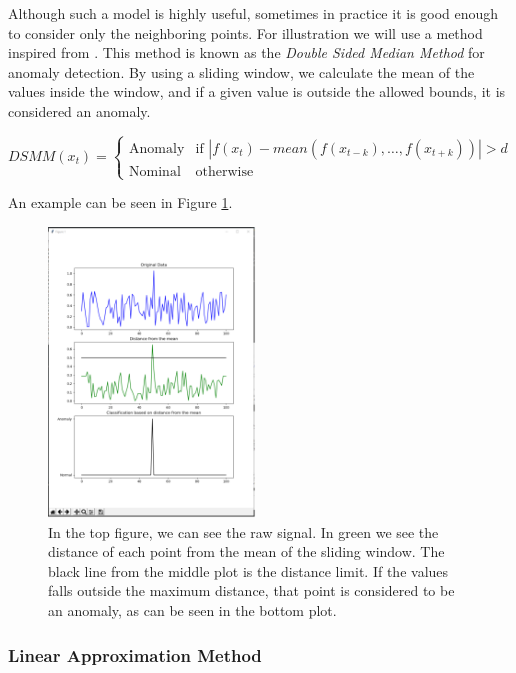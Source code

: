 \documentclass[a4paper, 10pt]{article}
\begin{document}
Although such a model is highly useful, sometimes in practice it is good enough to consider only the neighboring points. For illustration we will use a method inspired from \cite{MMAD2006}. This method is known as the \emph{Double Sided Median Method} for anomaly detection. By using a sliding window, we calculate the mean of the values inside the window, and if a given value is outside the allowed bounds, it is considered an anomaly. 

$$
	DSMM(x_t) = 
		\begin{cases}
            \text{Anomaly} & \text{if } |f(x_t) - mean(f(x_{t-k}), \dots, f(x_{t+k}))| > d \\
            \text{Nominal} & \text{otherwise}
        \end{cases}
$$

An example can be seen in Figure \ref{fig:DSMM}. \\

\begin{figure}
\centering
\includegraphics[width=0.49\textwidth]{DSMM}
\caption{In the top figure, we can see the raw signal. In green we see the distance of each point from the mean of the sliding window. The black line from the middle plot is the distance limit. If the values falls outside the maximum distance, that point is considered to be an anomaly, as can be seen in the bottom plot.}
\label{fig:DSMM}
\end{figure}

\FloatBarrier

\subsubsection{Linear Approximation Method}
\end{document}
